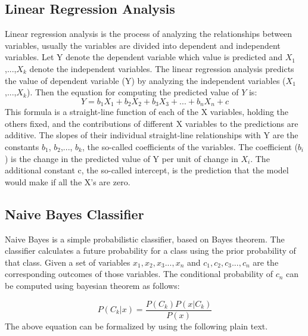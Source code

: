 \documentclass[12pt]{report}
\begin{document}
\subsection{Linear Regression Analysis}
Linear regression analysis is the process of analyzing the relationships between variables, usually the variables are divided into dependent and independent variables.  Let Y denote the dependent variable which value is predicted and $X_{1}$,...,$X_{k}$ denote the independent variables. The linear regression analysis predicts the value of dependent variable (Y) by analyzing the independent variables ($X_{1}$,...,$X_{k}$). Then the equation for computing the predicted value of $Y$ is:
\begin{equation}
\label{eq:linear_regression_analysis}
 Y=b_{1}X_{1}+b_{2}X_{2}+b_{3}X_{3}+...+b_{n}X_{n}+c
\end{equation}
This formula is a straight-line function of each of the X variables, holding the others fixed, and the contributions of different X variables to the predictions are additive. The slopes of their individual straight-line relationships with Y are the constants $b_{1}$, $b_{2}$,..., $b_{k}$, the so-called coefficients of the variables. The coefficient ($b_{i}$) is the change in the predicted value of Y per unit of change in $X_{i}$. The additional constant c, the so-called intercept, is the prediction that the model would make if all the X’s are zero. 


\subsection{Naive Bayes Classifier}
Naive Bayes is a simple probabilistic classifier, based on Bayes theorem. The classifier calculates a future probability for a class using the prior probability of that class. Given a set of variables $x_{1}, x_{2}, x_{3}..., x_{n}$ and $c_{1},c_{2},c_{3}...,c_{n}$ are the corresponding outcomes of those variables. The conditional probability of $c_{n}$ can be computed using bayesian theorem as follows:

\begin{equation}
P(C_{k}|x)=\frac{P(C_{k}) P(x|C_{k})}{P(x)}
\label{eq:Naive_Bayes_Classifier}
\end{equation}
The above equation can be formalized by using the following plain text.
\end{document}
